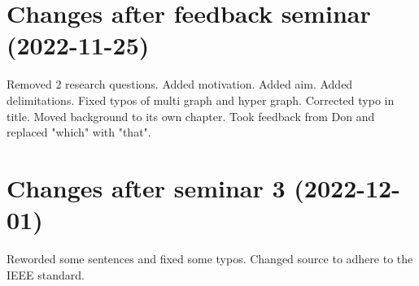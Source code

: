 \documentclass[msc,lith,english]{liuthesis}
\begin{document}
\printbibliography

\appendix
\chapter{Changes after feedback seminar (2022-11-25)}
Removed 2 research questions. Added motivation. Added aim. Added delimitations. Fixed typos of multi graph and hyper graph. Corrected typo in title. Moved background to its own chapter. Took feedback from Don and replaced "which" with "that".

\chapter{Changes after seminar 3 (2022-12-01)}
Reworded some sentences and fixed some typos. Changed source to adhere to the IEEE standard.
\end{document}

